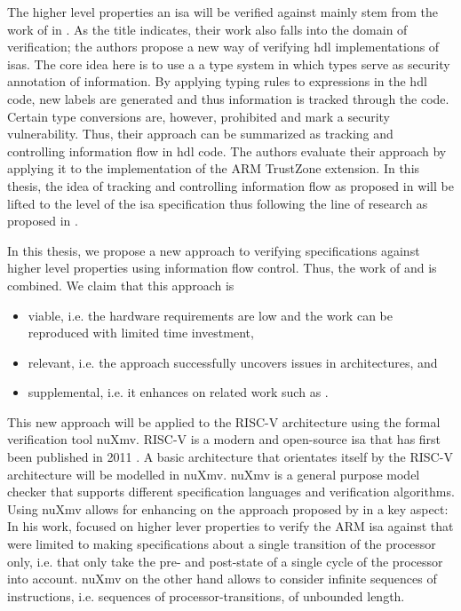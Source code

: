 The higher level properties an \gls{isa} will be verified against mainly stem from the work of \citeauthor{Ferraiuolo17} in  \cite{Ferraiuolo17}.
As the title indicates, their work also falls into the domain of verification; the authors propose a new way of verifying \gls{hdl} implementations of \glspl{isa}.
The core idea here is to use a a type system in which types serve as security annotation of information.
By applying typing rules to expressions in the \gls{hdl} code, new labels are generated and thus information is tracked through the code.
Certain type conversions are, however, prohibited and mark a security vulnerability.
Thus, their approach can be summarized as tracking and controlling information flow in \gls{hdl} code.
The authors evaluate their approach by applying it to the implementation of the ARM TrustZone extension.
In this thesis, the idea of tracking and controlling information flow as proposed in \cite{Ferraiuolo17} will be lifted to the level of the \gls{isa} specification thus following the line of research as proposed in \cite{Reid17}.

In this thesis, we propose a new approach to verifying specifications against higher level properties using information flow control.
Thus, the work of \citeauthor{Reid17} \cite{Reid17} and \citeauthor{Ferraiuolo17} \cite{Ferraiuolo17} is combined.
We claim that this approach is
\begin{itemize}
    \item viable, i.e. the hardware requirements are low and the work can be reproduced with limited time investment,
    \item relevant, i.e. the approach successfully uncovers issues in architectures, and
    \item supplemental, i.e. it enhances on related work such as \cite{Reid17}.
\end{itemize}

This new approach will be applied to the RISC-V architecture using the formal verification tool nuXmv.
RISC-V is a modern and open-source \gls{isa} that has first been published in 2011 \citeauthor{RiscVISA-org}.
A basic architecture that orientates itself by the RISC-V architecture will be modelled in nuXmv.
nuXmv is a general purpose model checker that supports different specification languages and verification algorithms.
Using nuXmv allows for enhancing on the approach proposed by \citeauthor{Reid17} in a key aspect:
In his work, \citeauthor{Reid17} focused on higher lever properties to verify the ARM \gls{isa} against that were limited to making specifications about a single transition of the processor only, i.e. that only take the pre- and post-state of a single cycle of the processor into account.
nuXmv on the other hand allows to consider infinite sequences of instructions, i.e. sequences of processor-transitions, of unbounded length.

